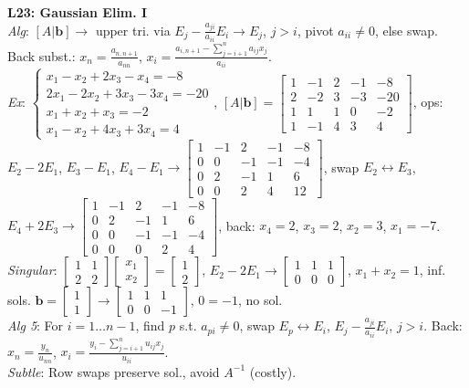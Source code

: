 \documentclass[9pt]{article}
\begin{document}
\begin{multicols}{3}
\textbf{L23: Gaussian Elim. I} \\
\textit{Alg}: $[A|\mathbf{b}] \to$ upper tri. via $E_j-\frac{a_{ji}}{a_{ii}}E_i \to E_j$, $j>i$, pivot $a_{ii} \neq 0$, else swap. Back subst.: $x_n=\frac{a_{n,n+1}}{a_{nn}}$, $x_i=\frac{a_{i,n+1}-\sum_{j=i+1}^n a_{ij}x_j}{a_{ii}}$. \\
\textit{Ex}: $\begin{cases}x_1-x_2+2x_3-x_4=-8\\2x_1-2x_2+3x_3-3x_4=-20\\x_1+x_2+x_3=-2\\x_1-x_2+4x_3+3x_4=4\end{cases}$, $[A|\mathbf{b}]=\begin{bmatrix}1&-1&2&-1&-8\\2&-2&3&-3&-20\\1&1&1&0&-2\\1&-1&4&3&4\end{bmatrix}$, ops: $E_2-2E_1$, $E_3-E_1$, $E_4-E_1 \to \begin{bmatrix}1&-1&2&-1&-8\\0&0&-1&-1&-4\\0&2&-1&1&6\\0&0&2&4&12\end{bmatrix}$, swap $E_2 \leftrightarrow E_3$, $E_4+2E_3 \to \begin{bmatrix}1&-1&2&-1&-8\\0&2&-1&1&6\\0&0&-1&-1&-4\\0&0&0&2&4\end{bmatrix}$, back: $x_4=2$, $x_3=2$, $x_2=3$, $x_1=-7$. \\
\textit{Singular}: $\begin{bmatrix}1&1\\2&2\end{bmatrix}\begin{bmatrix}x_1\\x_2\end{bmatrix}=\begin{bmatrix}1\\2\end{bmatrix}$, $E_2-2E_1 \to \begin{bmatrix}1&1&1\\0&0&0\end{bmatrix}$, $x_1+x_2=1$, inf. sols. $\mathbf{b}=\begin{bmatrix}1\\1\end{bmatrix} \to \begin{bmatrix}1&1&1\\0&0&-1\end{bmatrix}$, $0=-1$, no sol. \\
\textit{Alg 5}: For $i=1\ldots n-1$, find $p$ s.t. $a_{pi} \neq 0$, swap $E_p \leftrightarrow E_i$, $E_j-\frac{a_{ji}}{a_{ii}}E_i$, $j>i$. Back: $x_n=\frac{y_n}{u_{nn}}$, $x_i=\frac{y_i-\sum_{j=i+1}^n u_{ij}x_j}{u_{ii}}$. \\
\textit{Subtle}: Row swaps preserve sol., avoid $A^{-1}$ (costly).


\end{multicols}
\end{document}
